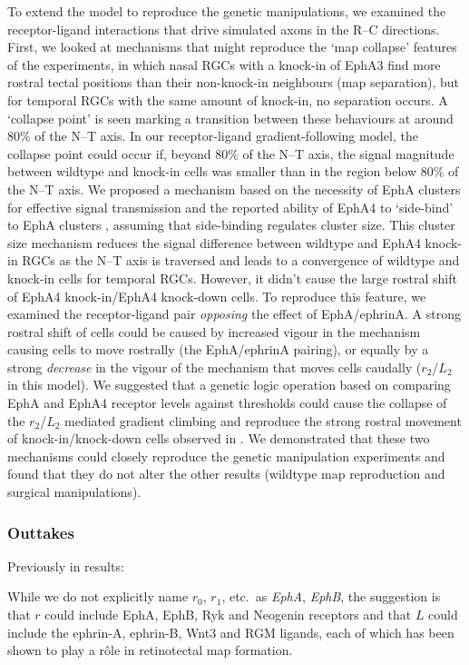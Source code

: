 \documentclass[9pt]{elife} %
\begin{document}
To extend the model to reproduce the genetic manipulations, we examined the receptor-ligand interactions that drive simulated axons in the R--C directions.
First, we looked at mechanisms that might reproduce the `map collapse' features of the experiments, in which nasal RGCs with a knock-in of EphA3 find more rostral tectal positions than their non-knock-in neighbours (map separation), but for temporal RGCs with the same amount of knock-in, no separation occurs.
A `collapse point' is seen marking a transition between these behaviours at around 80\% of the N--T axis.
In our receptor-ligand gradient-following model, the collapse point could occur if, beyond 80\% of the N--T axis, the signal magnitude between wildtype and knock-in cells was smaller than in the region below 80\% of the N--T axis.
We proposed a mechanism based on the necessity of EphA clusters for effective signal transmission and the reported ability of EphA4 to `side-bind' to EphA clusters \citep{nikolov_ephephrin_2013}, assuming that side-binding regulates cluster size.
This cluster size mechanism reduces the signal difference between wildtype and EphA4 knock-in RGCs as the N--T axis is traversed and leads to a convergence of wildtype and knock-in cells for temporal RGCs.
However, it didn't cause the large rostral shift of EphA4 knock-in/EphA4 knock-down cells. To reproduce this feature, we examined the receptor-ligand pair \emph{opposing} the effect of EphA/ephrinA.
A strong rostral shift of cells could be caused by increased vigour in the mechanism causing cells to move rostrally (the EphA/ephrinA pairing), or equally by a strong \emph{decrease} in the vigour of the mechanism that moves cells caudally ($r_2$/$L_2$ in this model).
We suggested that a genetic logic operation based on comparing EphA and EphA4 receptor levels against thresholds could cause the collapse of the $r_2$/$L_2$ mediated gradient climbing and reproduce the strong rostral movement of knock-in/knock-down cells observed in \citet{reber_relative_2004}.
We demonstrated that these two mechanisms could closely reproduce the genetic manipulation experiments and found that they do not alter the other results (wildtype map reproduction and surgical manipulations).

\subsubsection*{Outtakes}

Previously in results:

While we do not explicitly name $r_0$, $r_1$, etc.~as \emph{EphA}, \emph{EphB}, the suggestion is that $r$ could include EphA, EphB, Ryk \citep{schmitt_wntryk_2006} and Neogenin \citep{rajagopalan_neogenin_2004} receptors and that $L$ could include the ephrin-A, ephrin-B, Wnt3 \citep{schmitt_wntryk_2006} and RGM \citep{monnier_rgm_2002} ligands, each of which has been shown to play a r\^ole in retinotectal map formation.
\end{document}
